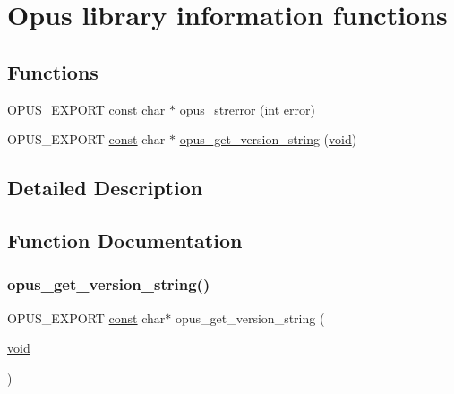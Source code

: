\hypertarget{group__opus__libinfo}{}\section{Opus library information functions}
\label{group__opus__libinfo}
\subsection*{Functions}
\begin{DoxyCompactItemize}
\item 
O\+P\+U\+S\+\_\+\+E\+X\+P\+O\+RT \hyperlink{zconf_8h_a2c212835823e3c54a8ab6d95c652660e}{const} char $\ast$ \hyperlink{group__opus__libinfo_ga4474c7a5797d39d8a3c3c14f64e9a30f}{opus\+\_\+strerror} (int error)
\item 
O\+P\+U\+S\+\_\+\+E\+X\+P\+O\+RT \hyperlink{zconf_8h_a2c212835823e3c54a8ab6d95c652660e}{const} char $\ast$ \hyperlink{group__opus__libinfo_gabd0ca7be4a4aa3e71ff7862f2c31866a}{opus\+\_\+get\+\_\+version\+\_\+string} (\hyperlink{png_8h_ac9c84fa68bbad002983e35ce3663c686}{void})
\end{DoxyCompactItemize}


\subsection{Detailed Description}


\subsection{Function Documentation}
\mbox{\label{group__opus__libinfo_gabd0ca7be4a4aa3e71ff7862f2c31866a}} 
\subsubsection{\texorpdfstring{opus\+\_\+get\+\_\+version\+\_\+string()}{opus\_get\_version\_string()}}
{\footnotesize\ttfamily O\+P\+U\+S\+\_\+\+E\+X\+P\+O\+RT \hyperlink{zconf_8h_a2c212835823e3c54a8ab6d95c652660e}{const} char$\ast$ opus\+\_\+get\+\_\+version\+\_\+string (\begin{DoxyParamCaption}\item[{\hyperlink{png_8h_ac9c84fa68bbad002983e35ce3663c686}{void}}]{ }\end{DoxyParamCaption})}

